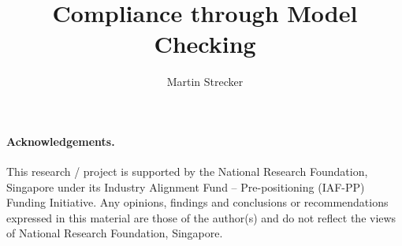 \documentclass[runningheads]{llncs}
\begin{document}


\title{Compliance through Model Checking}

\author{
Martin Strecker \and
}


\maketitle

\begin{abstract}

\end{abstract}









\paragraph{Acknowledgements.}
This research / project is supported by the National Research Foundation,
Singapore under its Industry Alignment Fund – Pre-positioning (IAF-PP) Funding
Initiative. Any opinions, findings and conclusions or recommendations
expressed in this material are those of the author(s) and do not reflect the
views of National Research Foundation, Singapore.

% 



% 
% 
% 
% 
\end{document}
